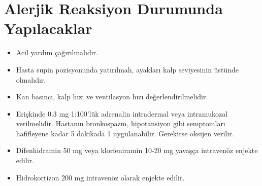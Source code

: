\section{Alerjik Reaksiyon Durumunda Yapılacaklar}
\begin{itemize}
   \item Acil yardım çağırılmalıdır.
   \item Hasta supin pozisyonunda yatırılmalı, ayakları kalp seviyesinin üstünde olmalıdır.
   \item Kan basıncı, kalp hızı ve ventilasyon hızı değerlendirilmelidir.
   \item Erişkinde 0.3 mg 1:100’lük adrenalin intradermal veya intramukozal verilmelidir. Hastanın bronkospazm, hipotansiyon gibi semptomları hafifleyene kadar 5 dakikada 1 uygulanabilir. Gerekirse oksijen verilir.
   \item Difenhidramin 50 mg veya klorfeniramin 10-20 mg yavaşça intravenöz enjekte edilir.
   \item Hidrokortizon 200 mg intravenöz olarak enjekte edilir.
  
\end{itemize}
